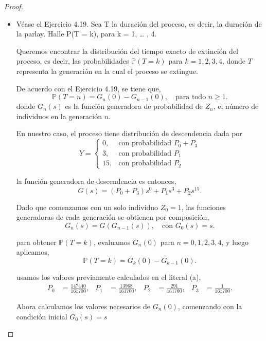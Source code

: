 \documentclass{article}
\begin{document}
\begin{proof}
\begin{itemize}

\item[(c)] Véase el Ejercicio 4.19. Sea T la duración del proceso, es decir, la duración de la parlay. Halle P(T = k), para k = 1, … , 4.


Queremos encontrar la distribución del tiempo exacto de extinción del proceso, es decir, las probabilidades \( \mathbb{P}(T = k) \) para \( k = 1, 2, 3, 4 \), donde \( T \) representa la generación en la cual el proceso se extingue.

De acuerdo con el Ejercicio 4.19, se tiene que,
\[
\mathbb{P}(T = n) = G_n(0) - G_{n-1}(0), \quad \text{para todo } n \geq 1.
\]
donde \( G_n(s) \) es la función generadora de probabilidad de \( Z_n \), el número de individuos en la generación \( n \).

En nuestro caso, el proceso tiene distribución de descendencia dada por
\[
Y = \begin{cases}
0, & \text{con probabilidad } P_0 + P_3 \\
3, & \text{con probabilidad } P_1 \\
15, & \text{con probabilidad } P_2
\end{cases}
\]

la función generadora de descendencia es entonces,
\[
G(s) = (P_0 + P_3)s^0 + P_1 s^3 + P_2 s^{15}.
\]

Dado que comenzamos con un solo individuo \( Z_0 = 1 \), las funciones generadoras de cada generación se obtienen por composición,
\[
G_n(s) = G(G_{n-1}(s)), \quad \text{con } G_0(s) = s.
\]

para obtener \( \mathbb{P}(T = k) \), evaluamos \( G_n(0) \) para \( n = 0, 1, 2, 3, 4 \), y luego aplicamos,
\[
\mathbb{P}(T = k) = G_k(0) - G_{k-1}(0).
\]

usamos los valores previamente calculados en el literal (a),
\begin{align*}
P_0 &= \frac{147440}{161700}, & P_1 &= \frac{13968}{161700}, & P_2 &= \frac{291}{161700}, & P_3 &= \frac{1}{161700}.
\end{align*}

Ahora calculamos los valores necesarios de \( G_n(0) \), comenzando con la condición inicial \( G_0(s) = s \)


\end{itemize}
\end{proof}
\end{document}
